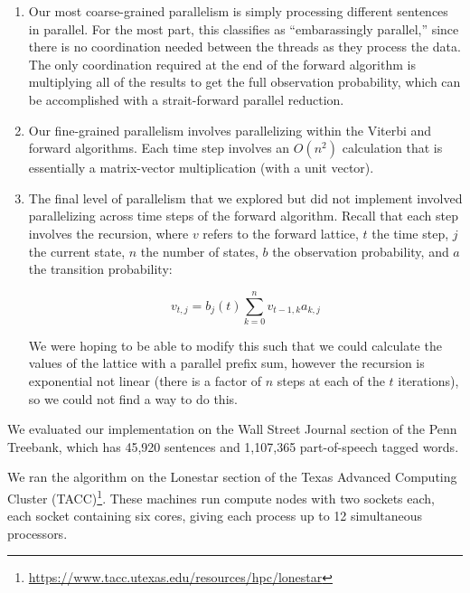 \documentclass[11pt,onecolumn]{article}
\begin{document}
\begin{enumerate}
  \item Our most coarse-grained parallelism is simply processing different sentences in parallel. For the most part, this classifies as ``embarassingly parallel,'' since there is no coordination needed between the threads as they process the data. The only coordination required at the end of the forward algorithm is multiplying all of the results to get the full observation probability, which can be accomplished with a strait-forward parallel reduction.

  \item Our fine-grained parallelism involves parallelizing within the Viterbi and forward algorithms. Each time step involves an $O(n^2)$ calculation that is essentially a matrix-vector multiplication (with a unit vector).

\item The final level of parallelism that we explored but did not implement involved parallelizing across time steps of the forward algorithm. Recall that each step involves the recursion, where $v$ refers to the forward lattice, $t$ the time step, $j$ the current state, $n$ the number of states, $b$ the observation probability, and $a$ the transition probability:

  \begin{equation}
    v_{t,j} = b_j(t) \sum_{k=0}^n v_{t - 1, k} a_{k,j}
  \end{equation}

  We were hoping to be able to modify this such that we could calculate the values of the lattice with a parallel prefix sum, however the recursion is exponential not linear (there is a factor of $n$ steps at each of the $t$ iterations), so we could not find a way to do this.

\end{enumerate}


We evaluated our implementation on the Wall Street Journal section of the Penn Treebank, which has 45,920 sentences and 1,107,365 part-of-speech tagged words.

We ran the algorithm on the Lonestar section of the Texas Advanced Computing Cluster (TACC)\footnote{\url{https://www.tacc.utexas.edu/resources/hpc/lonestar}}. These machines run compute nodes with two sockets each, each socket containing six cores, giving each process up to 12 simultaneous processors.

\end{document}
